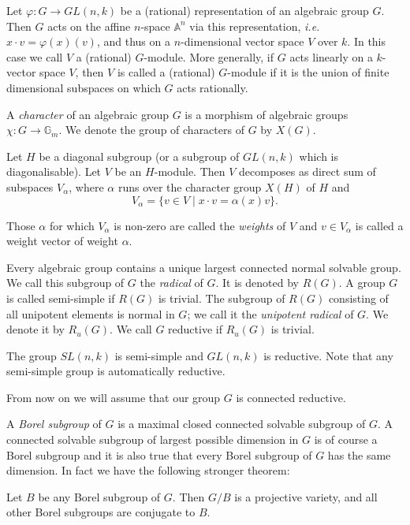 Let $\varphi:G\to GL(n,k)$ be a (rational) representation of an
algebraic group $G$. Then $G$ acts on the affine $n$-space
$\mathbb{A}^{n}$ via this representation, {\em i.e.} $x\cdot
v=\varphi(x)(v)$, and thus on a $n$-dimensional vector space $V$ over
$k$. In this case we call $V$ a (rational) $G$-module. More generally,
if $G$ acts linearly on a $k$-vector space $V$, then $V$ is called a
(rational) $G$-module 
if it is the union of finite dimensional
subspaces on which $G$ acts rationally.

A {\em character} of an algebraic group $G$ is a
morphism of algebraic 
groups $\chi:G\to \mathbb{G}_{m}$. We denote the group of characters
of $G$ by $X(G)$.

Let $H$ be a diagonal subgroup (or a subgroup of $GL(n,k)$ which is
diagonalisable). Let $V$ be an $H$-module. Then $V$ decomposes as
direct sum of subspaces $V_{\alpha}$, where $\alpha$ runs over the
character group $X(H)$ of $H$ and
$$
V_{\alpha}=\{v\in V\mid x\cdot v=\alpha(x)v\}.
$$

Those $\alpha$ for which $V_{\alpha}$ is non-zero are called the {\em
  weights} of $V$ and $v\in V_{\alpha}$ is called a weight
vector of
weight $\alpha$.

Every algebraic group contains a unique largest connected normal
solvable group. We call this subgroup of $G$ the {\em radical} of
$G$. It is denoted by $R(G)$. A group $G$ is called semi-simple if
$R(G)$ is trivial. The subgroup of $R(G)$ consisting of all
unipotent
elements is normal in $G$; we call it the {\em unipotent
  radical} of 
$G$. We denote it by $R_{u}(G)$. We call $G$ reductive if $R_{u}(G)$
is trivial.

The group $SL(n,k)$ is semi-simple and $GL(n,k)$ is
reductive. Note that any semi-simple
group is 
automatically reductive. 

From now on we will assume that our group $G$ is connected reductive.

A {\em Borel subgroup} of $G$ is a maximal
closed connected solvable 
subgroup of $G$. A connected solvable subgroup of largest possible
dimension in $G$ is of course a Borel subgroup and it is also true
that every Borel subgroup of $G$ has the same dimension. In fact we
have the following stronger theorem:

\begin{theorem}\label{chap1-thm1.1.1}
Let $B$ be any Borel subgroup of $G$. Then $G/B$ is a projective
variety, and all other Borel subgroups are conjugate to $B$. 
\end{theorem}

